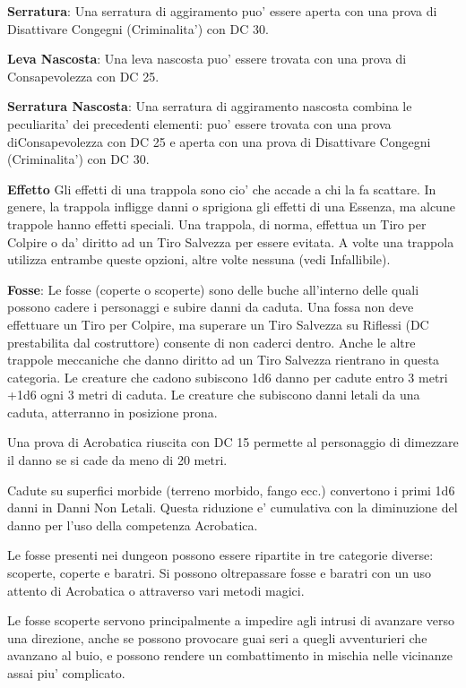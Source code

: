 \documentclass[a4paper,11pt,twoside,openany]{book}
\begin{document}
{		\textbf{Serratura}: Una serratura di aggiramento puo' essere aperta con una prova di Disattivare Congegni (Criminalita') con DC 30.
		
		\textbf{Leva Nascosta}: Una leva nascosta puo' essere trovata con una prova di Consapevolezza con DC 25.
		
		\textbf{Serratura Nascosta}: Una serratura di aggiramento nascosta combina le peculiarita' dei precedenti elementi: puo' essere trovata con una prova diConsapevolezza con DC 25 e aperta con una prova di Disattivare Congegni (Criminalita') con DC 30.
		
		\textbf{Effetto}
		Gli effetti di una trappola sono cio' che accade a chi la fa scattare. In genere, la trappola infligge danni o sprigiona gli effetti di una Essenza, ma alcune trappole hanno effetti speciali. Una trappola, di norma, effettua un Tiro per Colpire o da' diritto ad un Tiro Salvezza per essere evitata. A volte una trappola utilizza entrambe queste opzioni, altre volte nessuna (vedi Infallibile).
		
		\textbf{Fosse}: Le fosse (coperte o scoperte) sono delle buche all'interno delle quali possono cadere i personaggi e subire danni da caduta. Una fossa non deve effettuare un Tiro per Colpire, ma superare un Tiro Salvezza su Riflessi (DC prestabilita dal costruttore) consente di non caderci dentro. Anche le altre trappole meccaniche che danno diritto ad un Tiro Salvezza rientrano in questa categoria. Le creature che cadono subiscono 1d6 danno per cadute entro 3 metri +1d6 ogni 3 metri di caduta. Le creature che subiscono danni letali da una caduta,
		atterranno in posizione prona.
		
		Una prova di Acrobatica riuscita con DC 15 permette al personaggio di dimezzare il danno se si cade da meno di 20 metri.
		
		Cadute su superfici morbide (terreno morbido, fango ecc.) convertono i primi 1d6 danni in Danni Non Letali. Questa riduzione e' cumulativa con la diminuzione del danno per l'uso della competenza Acrobatica.
		
		Le fosse presenti nei dungeon possono essere ripartite in tre categorie diverse: scoperte, coperte e baratri. Si possono oltrepassare fosse e baratri con un uso attento di Acrobatica o attraverso vari metodi magici.
		
		Le fosse scoperte servono principalmente a impedire agli intrusi di avanzare verso una direzione, anche se possono provocare guai seri a quegli avventurieri che avanzano al buio, e possono rendere un combattimento in mischia nelle vicinanze assai piu' complicato.
		
}
\end{document}

